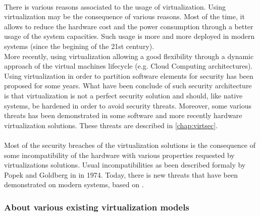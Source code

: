 \paragraph{}
There is various reasons associated to the usage of virtualization.
Using virtualization may be the consequence of various reasons. Most of the time, it allows to
reduce the hardware cost and the power consumption through a better usage of the system capacities.
Such usage is more and more deployed in modern systems (since the begining of the 21st century).\\
More recently, using virtualization allowing a good flexibility through a dynamic approach of the
virtual machines lifecycle (e.g. Cloud Computing architectures).\\
Using virtualization in order to partition software elements for security has been proposed for
some years. What have been conclude of such security architecture is that virtualization is not a
perfect security solution and should, like native systems, be hardened in order to avoid security
threats. Moreover, some various threats has been demonstrated in some software and more recently
hardware virtualization solutions. These threats are described in \ref{chap:virtsec}.

\paragraph{}
Most of the security breaches of the virtualization solutions is the consequence of some
incompatibility of the hardware with various properties requested by virtualizations solutions.
Usual incompatibilities as been described formaly by Popek and Goldberg in \cite{popek} in 1974.
Today, there is new threats that have been demonstrated on modern systems, based on
.

\subsubsection{About various existing virtualization models}

